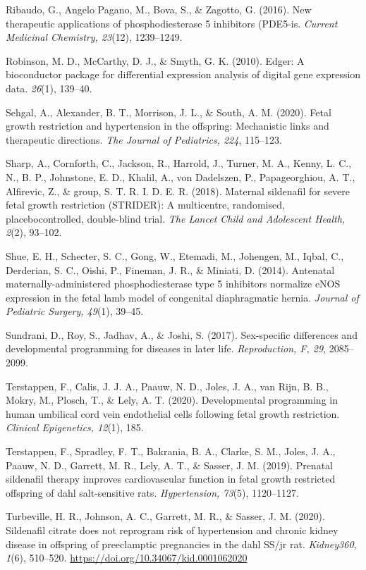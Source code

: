 \documentclass[authordate, empirical]{jote-new-article}
\begin{document}
Ribaudo, G., Angelo Pagano, M., Bova, S., \& Zagotto, G. (2016). New therapeutic applications of phosphodiesterase 5 inhibitors (PDE5-is. \emph{Current Medicinal Chemistry, 23}(12), 1239–1249. 

Robinson, M. D., McCarthy, D. J., \& Smyth, G. K. (2010). Edger: A bioconductor package for differential expression analysis of digital gene expression data. \emph{26}(1), 139–40.

Sehgal, A., Alexander, B. T., Morrison, J. L., \& South, A. M. (2020). Fetal growth restriction and hypertension in the offspring: Mechanistic links and therapeutic directions. \emph{The Journal of Pediatrics, 224}, 115–123.

Sharp, A., Cornforth, C., Jackson, R., Harrold, J., Turner, M. A., Kenny, L. C., N., B. P., Johnstone, E. D., Khalil, A., von Dadelszen, P., Papageorghiou, A. T., Alfirevic, Z., \& group, S. T. R. I. D. E. R. (2018). Maternal sildenafil for severe fetal growth restriction (STRIDER): A multicentre, randomised, placebocontrolled, double-blind trial. \emph{The Lancet Child and
Adolescent Health, 2}(2), 93–102.

Shue, E. H., Schecter, S. C., Gong, W., Etemadi, M., Johengen, M., Iqbal, C., Derderian, S. C., Oishi, P., Fineman, J. R., \& Miniati, D. (2014). Antenatal maternally-administered phosphodiesterase type 5 inhibitors normalize eNOS expression in the fetal lamb model of congenital diaphragmatic hernia. \emph{Journal of Pediatric Surgery, 49}(1), 39–45.

Sundrani, D., Roy, S., Jadhav, A., \& Joshi, S. (2017). Sex-specific differences and developmental programming for diseases in later life. \emph{Reproduction, F, 29}, 2085–2099.

Terstappen, F., Calis, J. J. A., Paauw, N. D., Joles, J. A., van Rijn, B. B., Mokry, M., Plosch, T., \& Lely, A. T. (2020). Developmental programming in human umbilical cord vein endothelial cells following fetal growth restriction. \emph{Clinical Epigenetics, 12}(1), 185.

Terstappen, F., Spradley, F. T., Bakrania, B. A., Clarke, S. M., Joles, J. A., Paauw, N. D., Garrett, M. R., Lely, A. T., \& Sasser, J. M. (2019). Prenatal sildenafil therapy improves cardiovascular function in fetal growth restricted offspring of dahl salt-sensitive rats. \emph{Hypertension, 73}(5), 1120–1127.

Turbeville, H. R., Johnson, A. C., Garrett, M. R., \& Sasser, J. M. (2020). Sildenafil citrate does not reprogram risk of hypertension and chronic kidney disease in offspring of preeclamptic pregnancies in the dahl SS/jr rat. \emph{Kidney360, 1}(6), 510–520. \url{https://doi.org/10.34067/kid.0001062020}
\end{document}
